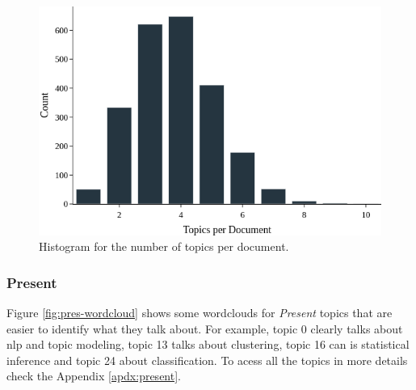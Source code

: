 \begin{figure}[h!]
	\centering
	\includegraphics[width=0.6\linewidth]{01.Chapters/05.Results/past-topic-per-doc}
	\caption{Histogram for the number of topics per document.}
	\label{fig:past-topic-per-doc}
\end{figure}


\subsubsection{Present}

Figure \ref{fig:pres-wordcloud} shows some wordclouds for \textit{Present} topics that are easier to identify what they talk about. For example, topic 0 clearly talks about nlp and topic modeling, topic 13 talks about clustering, topic 16 can is statistical inference and topic 24 about classification. To acess all the topics in more details check the Appendix \ref{apdx:present}.

